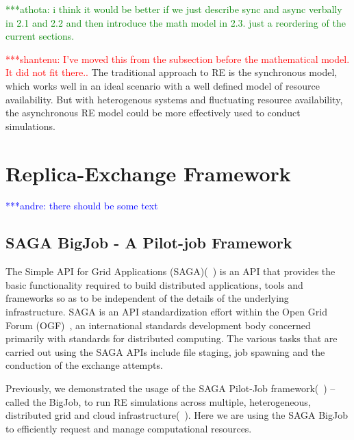 \documentclass{rspublic}
\newcommand{\jhanote}[1]{ {\textcolor{red} { ***shantenu: #1 }}}
\newcommand{\alnote}[1]{ {\textcolor{blue} { ***andre: #1 }}}
\newcommand{\athotanote}[1]{ {\textcolor{green} { ***athota: #1 }}}
\newcommand{\alnote}[1]{}
\newcommand{\athotanote}[1]{}
\newcommand{\jhanote}[1]{}
\begin{document}



\athotanote{i think it would be better if we just describe sync and async verbally in 2.1 and 2.2 and then introduce the math model in 2.3. just a reordering of the current sections.}

\jhanote{I've moved this from the subsection before the mathematical
  model. It did not fit there..} The traditional approach to RE is the
synchronous model, which works well in an ideal scenario with a well
defined model of resource availability. But with heterogenous systems
and fluctuating resource availability, the asynchronous RE model could
be more effectively used to conduct simulations.

\section{Replica-Exchange Framework}
\alnote{there should be some text}
\subsection{SAGA BigJob - A Pilot-job Framework}
\label{sec:BigJob}

The Simple API for Grid Applications (SAGA)(~\citep{saga_gfd90}) is an API that provides the basic functionality required to build distributed applications, tools and frameworks so as to be independent of the details of the underlying infrastructure. SAGA is an API standardization effort within the Open Grid Forum (OGF)~\citep{ogf_web}, an international standards development body concerned primarily with standards for distributed computing. The various tasks that are carried out using the SAGA APIs include file staging, job spawning and the conduction of the exchange attempts.

Previously, we demonstrated the usage of the SAGA Pilot-Job framework(~\citep{saga_bigjob_condor_cloud}) -- called the BigJob, to run RE simulations across multiple, heterogeneous, distributed grid and cloud infrastructure(~\citep{Luckow:2008fp}). Here we are using the SAGA BigJob to efficiently request and manage computational resources. 
\end{document}
